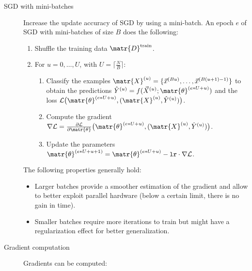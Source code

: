 \begin{description}
    \item[SGD with mini-batches] 
        Increase the update accuracy of SGD by using a mini-batch.
        An epoch $e$ of SGD with mini-batches of size $B$ does the following:
        \begin{enumerate}
            \item Shuffle the training data $\matr{D}^\text{train}$.
            \item For $u = 0, \dots, U$, with $U = \lceil \frac{N}{B} \rceil$:
            \begin{enumerate}
                \item Classify the examples $\matr{X}^{(u)} = \{ \vec{x}^{(Bu)}, \dots, \vec{x}^{(B(u+1)-1)} \}$ 
                    to obtain the predictions $\hat{Y}^{(u)} = f(\vec{X}^{(u)}; \matr{\theta}^{(e*U+u)})$
                    and the loss $\mathcal{L}\big( \matr{\theta}^{(e*U+u)}, (\matr{X}^{(u)}, \hat{Y}^{(u)}) \big)$.
                \item Compute the gradient $\nabla \mathcal{L} = \frac{\partial\mathcal{L}}{\partial \matr{\theta}}\big( \matr{\theta}^{(e*U+u)}, (\matr{X}^{(u)}, \hat{Y}^{(u)}) \big)$.
                \item Update the parameters $\matr{\theta}^{(e*U+u+1)} = \matr{\theta}^{(e*U+u)} - \texttt{lr} \cdot \nabla \mathcal{L}$.
            \end{enumerate}
        \end{enumerate}

        The following properties generally hold:
        \begin{itemize}
            \item Larger batches provide a smoother estimation of the gradient and allow to better exploit parallel hardware (below a certain limit, there is no gain in time).
            \item Smaller batches require more iterations to train but might have a regularization effect for better generalization.
        \end{itemize}

    \item[Gradient computation] 
        Gradients can be computed:
\end{description}



